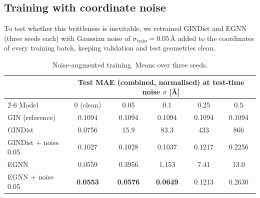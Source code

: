 \documentclass[11pt,a4paper]{article}
\newcommand{\best}[1]{\textbf{#1}}
\begin{document}
\subsection{Training with coordinate noise}\label{sec:augmentation}

To test whether this brittleness is inevitable, we retrained GINDist and EGNN (three seeds
each) with Gaussian noise of $\sigma_{\text{train}} = 0.05$\,\AA{} added to the coordinates of
every training batch, keeping validation and test geometries clean.

\begin{table}[h]
\centering
\small
\begin{tabular}{lccccc}
\toprule
& \multicolumn{5}{c}{Test MAE (combined, normalised) at test-time noise $\sigma$ [\AA]} \\
\cmidrule(lr){2-6}
Model & 0 (clean) & 0.05 & 0.1 & 0.25 & 0.5 \\
\midrule
GIN (reference)          & 0.1094 & 0.1094 & 0.1094 & 0.1094 & 0.1094 \\
GINDist                  & 0.0756 & 15.9   & 83.3   & 433    & 866    \\
GINDist + noise 0.05     & 0.1027 & 0.1028 & 0.1037 & 0.1217 & 0.2256 \\
EGNN                     & 0.0559 & 0.3956 & 1.153  & 7.41   & 13.0   \\
EGNN + noise 0.05        & \best{0.0553} & \best{0.0576} & \best{0.0649} & 0.1213 & 0.2630 \\
\bottomrule
\end{tabular}
\caption{Noise-augmented training. Means over three seeds.}
\label{tab:augmentation}
\end{table}
\end{document}
